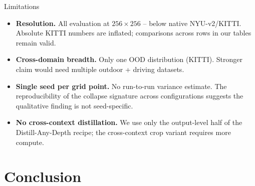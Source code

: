 \documentclass[aspectratio=169,10pt]{beamer}
\begin{document}
\begin{frame}{Limitations}
\begin{itemize}\setlength{\itemsep}{0.3em}
  \item \textbf{Resolution.} All evaluation at $256{\times}256$ -- below native NYU-v2/KITTI. Absolute KITTI numbers are inflated; comparisons across rows in our tables remain valid.
  \item \textbf{Cross-domain breadth.} Only one OOD distribution (KITTI). Stronger claim would need multiple outdoor + driving datasets.
  \item \textbf{Single seed per grid point.} No run-to-run variance estimate. The reproducibility of the collapse signature across configurations suggests the qualitative finding is not seed-specific.
  \item \textbf{No cross-context distillation.} We use only the output-level half of the Distill-Any-Depth recipe; the cross-context crop variant requires more compute.
\end{itemize}
\end{frame}

\section{Conclusion}
\end{document}
